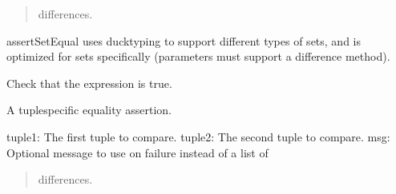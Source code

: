 \documentclass[letterpaper,10pt,english]{sphinxmanual}
\begin{document}
\begin{fulllineitems}
\begin{fulllineitems}
\begin{description}
\begin{quote}
\sphinxAtStartPar
differences.
\end{quote}

\end{description}

\sphinxAtStartPar
assertSetEqual uses ducktyping to support different types of sets, and
is optimized for sets specifically (parameters must support a
difference method).

\end{fulllineitems}


\begin{fulllineitems}
\label{\detokenize{_autosummary/tests.test_unit.test_df:tests.test_unit.test_df.assertTrue}}
\pysigstartsignatures
{}
\pysigstopsignatures
\sphinxAtStartPar
Check that the expression is true.

\end{fulllineitems}


\begin{fulllineitems}
\label{\detokenize{_autosummary/tests.test_unit.test_df:tests.test_unit.test_df.assertTupleEqual}}
\pysigstartsignatures
{}
\pysigstopsignatures
\sphinxAtStartPar
A tuple\sphinxhyphen{}specific equality assertion.
\begin{description}
\sphinxAtStartPar
tuple1: The first tuple to compare.
tuple2: The second tuple to compare.
msg: Optional message to use on failure instead of a list of
\begin{quote}

\sphinxAtStartPar
differences.
\end{quote}

\end{description}

\end{fulllineitems}



\end{fulllineitems}
\end{document}

